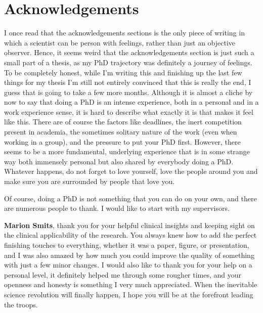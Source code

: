 \chapter{Acknowledgements}
\begin{ChapterAbstractNoTitle}
\end{ChapterAbstractNoTitle}

I once read that the acknowledgements sections is the only piece of writing in which a scientist can be person with feelings, rather than just an objective observer.
Hence, it seems weird that the acknowledgements section is just such a small part of a thesis, as my PhD trajectory was definitely a journey of feelings.
To be completely honest, while I'm writing this and finishing up the last few things for my thesis I'm still not entirely convinced that this is really the end, I guess that is going to take a few more months.
Although it is almost a cliche by now to say that doing a PhD is an intense experience, both in a personal and in a work experience sense, it is hard to describe what exactly it is that makes it feel like this.
There are of course the factors like deadlines, the inert competition present in academia, the sometimes solitary nature of the work (even when working in a group), and the pressure to put your PhD first.
However, there seems to be a more fundamental, underlying experience that is in some strange way both immensely personal but also shared by everybody doing a PhD.
Whatever happens, do not forget to love yourself, love the people around you and make sure you are surrounded by people that love you.

Of course, doing a PhD is not something that you can do on your own, and there are numerous people to thank.
I would like to start with my supervisors.

\textbf{Marion Smits}, thank you for your helpful clinical insights and keeping sight on the clinical applicability of the research.
You always knew how to add the perfect finishing touches to everything, whether it was a paper, figure, or presentation, and I was also amazed by how much you could improve the quality of something with just a few minor changes.
I would also like to thank you for your help on a personal level, it definitely helped me through some rougher times, and your openness and honesty is something I very much appreciated.
When the inevitable science revolution will finally happen, I hope you will be at the forefront leading the troops.

